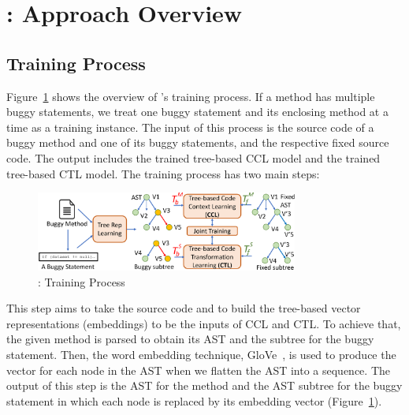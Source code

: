 \section{{\tool}: Approach Overview}
\label{overview:sec}



\subsection{Training Process}

Figure~\ref{overview-training} shows the overview of {\tool}'s
training process. If a method has multiple buggy statements, we treat
one buggy statement and its enclosing method at a time as a training
instance. The input of this process is the source code of a buggy
method and one of its buggy statements, and the respective fixed
source code.  The output includes the trained tree-based CCL model and
the trained tree-based CTL model.
%
The training process has two main steps:

\begin{figure}[t]
	\centering
	\includegraphics[width=3.4in]{graphs/new_overview-2.png}
        \vspace{-15pt}
	\caption{{\tool}: Training Process}
	\label{overview-training}
\end{figure}

 This step aims to
take the source code and to build the tree-based vector
representations (embeddings) to be the inputs of CCL and CTL. To
achieve that, the given method is parsed to obtain its AST
and the subtree for the buggy statement.
Then, the word embedding technique, GloVe~\cite{pennington2014glove},
is used to produce the vector for each node in the AST when we flatten
the AST into a sequence. The output of this step is the AST for the
method and the AST subtree for the buggy statement
in which each node is replaced by its embedding vector
(Figure~\ref{overview-training}).

